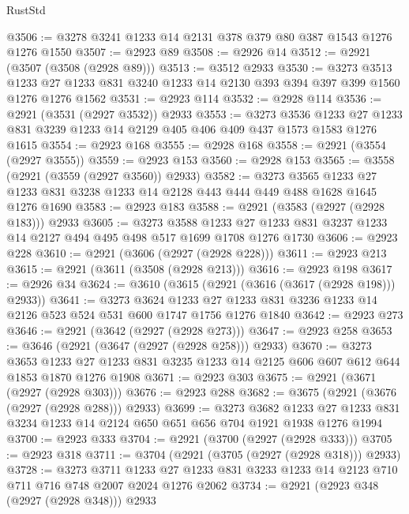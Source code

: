 \begin{lexlean}{RustStd}
\begin{coremodule}
@3506 := @3278 @3241 @1233 @14 @2131 @378 @379 @80 @387 @1543 @1276 @1276 @1550
@3507 := @2923 @89
@3508 := @2926 @14
@3512 := @2921 (@3507 (@3508 (@2928 @89)))
@3513 := @3512 @2933
@3530 := @3273
    @3513
    @1233
    @27
    @1233
    @831
    @3240
    @1233
    @14
    @2130
    @393
    @394
    @397
    @399
    @1560
    @1276
    @1276
    @1562
@3531 := @2923 @114
@3532 := @2928 @114
@3536 := @2921 (@3531 (@2927 @3532)) @2933
@3553 := @3273
    @3536
    @1233
    @27
    @1233
    @831
    @3239
    @1233
    @14
    @2129
    @405
    @406
    @409
    @437
    @1573
    @1583
    @1276
    @1615
@3554 := @2923 @168
@3555 := @2928 @168
@3558 := @2921 (@3554 (@2927 @3555))
@3559 := @2923 @153
@3560 := @2928 @153
@3565 := @3558 (@2921 (@3559 (@2927 @3560)) @2933)
@3582 := @3273
    @3565
    @1233
    @27
    @1233
    @831
    @3238
    @1233
    @14
    @2128
    @443
    @444
    @449
    @488
    @1628
    @1645
    @1276
    @1690
@3583 := @2923 @183
@3588 := @2921 (@3583 (@2927 (@2928 @183))) @2933
@3605 := @3273
    @3588
    @1233
    @27
    @1233
    @831
    @3237
    @1233
    @14
    @2127
    @494
    @495
    @498
    @517
    @1699
    @1708
    @1276
    @1730
@3606 := @2923 @228
@3610 := @2921 (@3606 (@2927 (@2928 @228)))
@3611 := @2923 @213
@3615 := @2921 (@3611 (@3508 (@2928 @213)))
@3616 := @2923 @198
@3617 := @2926 @34
@3624 := @3610 (@3615 (@2921 (@3616 (@3617 (@2928 @198))) @2933))
@3641 := @3273
    @3624
    @1233
    @27
    @1233
    @831
    @3236
    @1233
    @14
    @2126
    @523
    @524
    @531
    @600
    @1747
    @1756
    @1276
    @1840
@3642 := @2923 @273
@3646 := @2921 (@3642 (@2927 (@2928 @273)))
@3647 := @2923 @258
@3653 := @3646 (@2921 (@3647 (@2927 (@2928 @258))) @2933)
@3670 := @3273
    @3653
    @1233
    @27
    @1233
    @831
    @3235
    @1233
    @14
    @2125
    @606
    @607
    @612
    @644
    @1853
    @1870
    @1276
    @1908
@3671 := @2923 @303
@3675 := @2921 (@3671 (@2927 (@2928 @303)))
@3676 := @2923 @288
@3682 := @3675 (@2921 (@3676 (@2927 (@2928 @288))) @2933)
@3699 := @3273
    @3682
    @1233
    @27
    @1233
    @831
    @3234
    @1233
    @14
    @2124
    @650
    @651
    @656
    @704
    @1921
    @1938
    @1276
    @1994
@3700 := @2923 @333
@3704 := @2921 (@3700 (@2927 (@2928 @333)))
@3705 := @2923 @318
@3711 := @3704 (@2921 (@3705 (@2927 (@2928 @318))) @2933)
@3728 := @3273
    @3711
    @1233
    @27
    @1233
    @831
    @3233
    @1233
    @14
    @2123
    @710
    @711
    @716
    @748
    @2007
    @2024
    @1276
    @2062
@3734 := @2921 (@2923 @348 (@2927 (@2928 @348))) @2933

\end{coremodule}
\end{lexlean}
